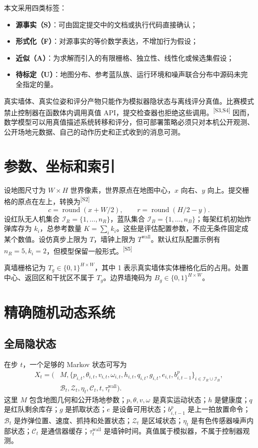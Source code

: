 \documentclass[UTF8,11pt]{ctexart}
\newcommand{\src}[1]{\textsuperscript{\textcolor{blue!65!black}{[#1]}}}
\begin{document}
本文采用四类标签：
\begin{itemize}
  \item \textbf{源事实（S）}：可由固定提交中的文档或执行代码直接确认；
  \item \textbf{形式化（F）}：对源事实的等价数学表达，不增加行为假设；
  \item \textbf{近似（A）}：为求解而引入的有限栅格、独立性、线性化或候选集假设；
  \item \textbf{待标定（U）}：地图分布、参考蓝队族、运行环境和噪声联合分布中源码未完全指定的量。
\end{itemize}

真实墙体、真实位姿和评分产物只能作为模拟器隐状态与离线评分真值。比赛模式禁止控制器在函数体内调用真值 API，提交检查器也拒绝这些调用。\src{S3,S4} 因而，数学模型可以用真值描述系统转移和评分，但可部署策略必须只对本机公开观测、公开场地元数据、自己的动作历史和正式收到的消息可测。

\section{参数、坐标和索引}

设地图尺寸为 $W\times H$ 世界像素，世界原点在地图中心，$x$ 向右、$y$ 向上。提交栅格的原点在左上，转换为\src{S2}
\begin{equation}
c=\operatorname{round}(x+W/2),\qquad
r=\operatorname{round}(H/2-y).
\label{eq:world-grid}
\end{equation}
设红队无人机集合 $\mathcal I_R=\{1,\ldots,n_R\}$，蓝队集合 $\mathcal I_B=\{1,\ldots,n_B\}$；每架红机初始炸弹库存为 $k_i$，总参考数量 $K=\sum_i k_i$。这些是评估配置参数，不应无条件固定成某个数值。设仿真步上限为 $T$，墙钟上限为 $T^{\mathrm{wall}}$。默认红队配置示例有 $n_R=5,k_i=2$，但模型保留一般形式。\src{S5}

真墙栅格记为 $T_g\in\{0,1\}^{H\times W}$，其中 1 表示真实墙体实体栅格化后的占用。处置中心、返回区和干扰区不属于 $T_g$。边界墙掩码为 $B_g\in\{0,1\}^{H\times W}$。

\section{精确随机动态系统}

\subsection{全局隐状态}

在步 $t$，一个足够的 Markov 状态可写为
\begin{align}
X_t=(&M,\{p_{i,t},\theta_{i,t},v_{i,t},\omega_{i,t},h_{i,t},q_{i,t},g_{i,t},e_{i,t},b^{p}_{i,t-1}\}_{i\in\mathcal I_R\cup\mathcal I_B},\nonumber\\
&\mathcal B_t,\mathcal Z_t,\eta_t,\mathcal C_t,t,\tau^{\mathrm{wall}}_t).
\label{eq:state}
\end{align}
这里 $M$ 包含地图几何和公开场地参数；$p,\theta,v,\omega$ 是真实运动状态；$h$ 是健康度；$q$ 是红队剩余库存；$g$ 是抓取状态；$e$ 是设备可用状态；$b^p_{i,t-1}$ 是上一拍放置命令；$\mathcal B_t$ 是炸弹位置、速度、抓持和处置状态；$\mathcal Z_t$ 是区域状态；$\eta_t$ 是有色传感器噪声内部状态；$\mathcal C_t$ 是通信器缓存；$\tau^{\mathrm{wall}}_t$ 是墙钟时间。真值属于模拟器，不属于控制器观测。
\end{document}
